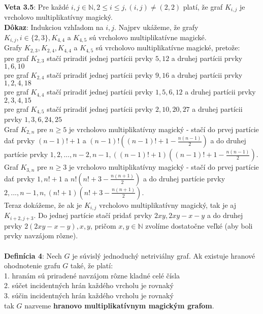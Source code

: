 \documentclass[12pt]{article}
\begin{document}
\textbf{Veta 3.5}: Pre každé $i,j \in \mathbb{N}, 2 \leq i \leq j, (i, j) \neq (2, 2)$ platí, že graf $K_{i,j}$ je vrcholovo multiplikatívny magický. \\

\textbf{Dôkaz}: Indukciou vzhľadom na $i,j$. Najprv ukážeme, že grafy $K_{i,j}, i \in \{2,3\}, K_{4,4}$ a $K_{4,5}$ sú vrcholovo multiplikatívne magické. \\

Grafy $K_{2,3}, K_{2,4}, K_{4,4}$ a $K_{4,5}$ sú vrcholovo multiplikatívne magické, pretože: \\
pre graf $K_{2,3}$ stačí priradiť jednej partícii prvky $5, 12$ a druhej partícii prvky $1, 6, 10$ \\
pre graf $K_{2,4}$ stačí priradiť jednej partícii prvky $9, 16$ a druhej partícii prvky $1, 2, 4, 18$ \\
pre graf $K_{4,4}$ stačí priradiť jednej partícii prvky $1, 5, 6, 12$ a druhej partícii prvky $2, 3, 4, 15$ \\
pre graf $K_{4,5}$ stačí priradiť jednej partícii prvky $2, 10, 20, 27$ a druhej partícii prvky $1, 3, 6, 24, 25$ \\

Graf $K_{2,n}$ pre $n \geq 5$ je vrcholovo multiplikatívny magický - stačí do prvej partície dať prvky $(n-1)! + 1$ a $(n-1)! ((n-1)! + 1 - \frac{n(n-1)}{2})$ a do druhej partície prvky $1, 2, ... , n-2, n-1, ((n-1)! + 1) ((n-1)! + 1 - \frac{n(n-1)}{2})$. \\

Graf $K_{3,n}$ pre $n \geq 3$ je vrcholovo multiplikatívny magický - stačí do prvej partície dať prvky $1, n! + 1$ a $n! (n! + 3 - \frac{n(n+1)}{2})$ a do druhej partície prvky $2, ... , n-1, n, (n! + 1) (n! + 3 - \frac{n(n+1)}{2})$. \\

Teraz dokážeme, že ak je $K_{i,j}$ vrcholovo multiplikatívny magický, tak je aj $K_{i+2,j+3}$. Do jednej partície stačí pridať prvky $2xy, 2xy - x - y$ a do druhej prvky $2(2xy - x - y), x, y$, pričom $x,y \in \mathbb{N}$ zvolíme dostatočne veľké (aby boli prvky navzájom rôzne). \\\\ 

\textbf{Definícia 4}: Nech $G$ je súvislý jednoduchý netriviálny graf. Ak existuje hranové ohodnotenie grafu $G$ také, že platí: \\
1. hranám sú priradené navzájom rôzne kladné celé čísla \\
2. súčet incidentných hrán každého vrcholu je rovnaký \\
3. súčin incidentných hrán každého vrcholu je rovnaký \\
tak $G$ nazveme \textbf{hranovo multiplikatívnym magickým grafom}. \\
\end{document}

